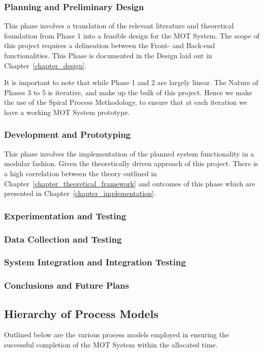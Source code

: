 \subsubsection{Planning and Preliminary Design}
This phase involves a translation of the relevant literature and theoretical
foundation from Phase 1 into a feasible design for the MOT System. The scope of
this project requires a delineation between the Front- and Back-end
functionalities. This Phase is documented in the Design laid out in
Chapter~\ref{chapter_design}.

It is important to note that while Phase 1 and 2 are largely linear. The Nature
of Phases 3 to 5 is iterative, and make up the bulk of this project. Hence we
make the use of the Spiral Process Methodology, to ensure that at each iteration
we have a working MOT System prototype.  

\subsubsection{Development and Prototyping}
This phase involves the implementation of the planned system functionality in a
modular fashion. Given the theoretically driven approach of this project. There
is a high correlation between the theory outlined in
Chapter~\ref{chapter_theoretical_framework} and outcomes of this phase which are
presented in Chapter~\ref{chapter_implementation}.

\subsubsection{Experimentation and Testing}

\subsubsection{Data Collection and Testing}

\subsubsection{System Integration and Integration Testing}

\subsubsection{Conclusions and Future Plans}



\subsection{Hierarchy of Process Models}
Outlined below are the various process models employed in ensuring the
successful completion of the MOT System within the allocated time.


